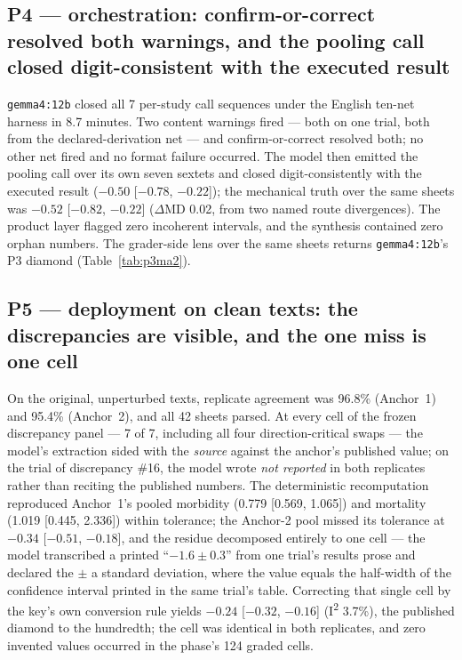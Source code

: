 \documentclass[11pt]{article}
\begin{document}
\subsection{P4 --- orchestration: confirm-or-correct resolved both warnings, and the pooling call closed digit-consistent with the executed result}
\texttt{gemma4:12b} closed all 7 per-study call sequences under the English ten-net harness in 8.7 minutes. Two content warnings fired --- both on one trial, both from the declared-derivation net --- and confirm-or-correct resolved both; no other net fired and no format failure occurred. The model then emitted the pooling call over its own seven sextets and closed digit-consistently with the executed result ($-0.50$ [$-0.78$, $-0.22$]); the mechanical truth over the same sheets was $-0.52$ [$-0.82$, $-0.22$] ($\Delta$MD 0.02, from two named route divergences). The product layer flagged zero incoherent intervals, and the synthesis contained zero orphan numbers. The grader-side lens over the same sheets returns \texttt{gemma4:12b}'s P3 diamond (Table~\ref{tab:p3ma2}).

\subsection{P5 --- deployment on clean texts: the discrepancies are visible, and the one miss is one cell}
On the original, unperturbed texts, replicate agreement was 96.8\% (Anchor~1) and 95.4\% (Anchor~2), and all 42 sheets parsed. At every cell of the frozen discrepancy panel --- 7 of 7, including all four direction-critical swaps --- the model's extraction sided with the \emph{source} against the anchor's published value; on the trial of discrepancy \#16, the model wrote \emph{not reported} in both replicates rather than reciting the published numbers. The deterministic recomputation reproduced Anchor~1's pooled morbidity (0.779 [0.569, 1.065]) and mortality (1.019 [0.445, 2.336]) within tolerance; the Anchor-2 pool missed its tolerance at $-0.34$ [$-0.51$, $-0.18$], and the residue decomposed entirely to one cell --- the model transcribed a printed ``$-1.6\pm0.3$'' from one trial's results prose and declared the $\pm$ a standard deviation, where the value equals the half-width of the confidence interval printed in the same trial's table. Correcting that single cell by the key's own conversion rule yields $-0.24$ [$-0.32$, $-0.16$] (I\textsuperscript{2} 3.7\%), the published diamond to the hundredth; the cell was identical in both replicates, and zero invented values occurred in the phase's 124 graded cells.
\end{document}
